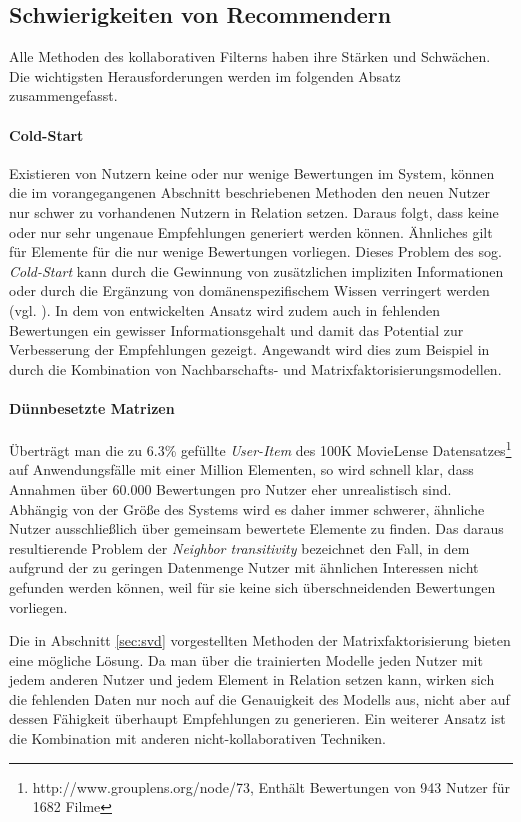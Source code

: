 \subsection{Schwierigkeiten von Recommendern}\label{sec:filterissues}

Alle Methoden des kollaborativen Filterns haben ihre Stärken und Schwächen. Die wichtigsten Herausforderungen werden im folgenden Absatz zusammengefasst.

\paragraph{Cold-Start} Existieren von Nutzern keine oder nur wenige Bewertungen im System, können die im vorangegangenen Abschnitt beschriebenen Methoden den neuen Nutzer nur schwer zu vorhandenen Nutzern in Relation setzen. Daraus folgt, dass keine oder nur sehr ungenaue Empfehlungen generiert werden können. Ähnliches gilt für Elemente für die nur wenige Bewertungen vorliegen. Dieses Problem des sog. \textit{Cold-Start} kann durch die Gewinnung von zusätzlichen impliziten Informationen oder durch die Ergänzung von domänenspezifischem Wissen verringert werden (vgl. \citep{claypool99}).  In dem von \citep{Steck:2010:TTR:1835804.1835895} entwickelten Ansatz wird zudem auch in fehlenden Bewertungen ein gewisser Informationsgehalt und damit das Potential zur Verbesserung der Empfehlungen gezeigt. Angewandt wird dies zum Beispiel in \citep{Toscher:2008:INA:1722149.1722153} durch die Kombination von Nachbarschafts- und Matrixfaktorisierungsmodellen.

\paragraph{Dünnbesetzte Matrizen} Überträgt man die zu 6.3\% gefüllte \textit{User-Item} des 100K MovieLense Datensatzes\footnote{http://www.grouplens.org/node/73, Enthält Bewertungen von 943 Nutzer für 1682 Filme} auf Anwendungsfälle mit einer Million Elementen, so wird schnell klar, dass Annahmen über 60.000 Bewertungen pro Nutzer eher unrealistisch sind. Abhängig von der Größe des Systems wird es daher immer schwerer, ähnliche Nutzer ausschließlich über gemeinsam bewertete Elemente zu finden. Das daraus resultierende Problem der \textit{Neighbor transitivity} bezeichnet den Fall, in dem aufgrund der zu geringen Datenmenge Nutzer mit ähnlichen Interessen nicht gefunden werden können, weil für sie keine sich überschneidenden Bewertungen vorliegen.

Die in Abschnitt \ref{sec:svd} vorgestellten Methoden der Matrixfaktorisierung bieten eine mögliche Lösung. Da man über die trainierten Modelle jeden Nutzer mit jedem anderen Nutzer und jedem Element in Relation setzen kann, wirken sich die fehlenden Daten nur noch auf die Genauigkeit des Modells aus, nicht aber auf dessen Fähigkeit überhaupt Empfehlungen zu generieren. Ein weiterer Ansatz ist die Kombination mit anderen nicht-kollaborativen Techniken. \citep{Koren:2009:MFT:1608565.1608614,claypool99}

